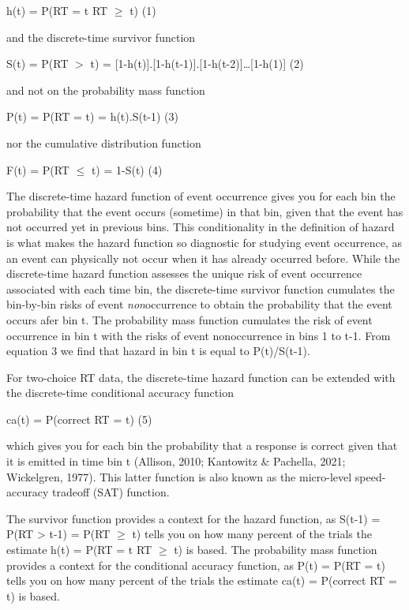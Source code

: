 \documentclass[
  man, donotrepeattitle,floatsintext]{apa6}
\begin{document}
\noindent h(t) = P(RT = t\textbar{} RT \(\geq\) t) \hfill  (1)

\noindent and the discrete-time survivor function

\noindent S(t) = P(RT \(>\) t) = {[}1-h(t){]}.{[}1-h(t-1){]}.{[}1-h(t-2){]}\ldots{[}1-h(1){]} \hfill  (2)

\noindent and not on the probability mass function

\noindent P(t) = P(RT = t) = h(t).S(t-1) \hfill  (3)

\noindent nor the cumulative distribution function

\noindent F(t) = P(RT \(\leq\) t) = 1-S(t) \hfill  (4)

The discrete-time hazard function of event occurrence gives you for each bin the probability that the event occurs (sometime) in that bin, given that the event has not occurred yet in previous bins. This conditionality in the definition of hazard is what makes the hazard function so diagnostic for studying event occurrence, as an event can physically not occur when it has already occurred before. While the discrete-time hazard function assesses the unique risk of event occurrence associated with each time bin, the discrete-time survivor function cumulates the bin-by-bin risks of event \emph{non}occurrence to obtain the probability that the event occurs afer bin t. The probability mass function cumulates the risk of event occurrence in bin t with the risks of event nonoccurrence in bins 1 to t-1. From equation 3 we find that hazard in bin t is equal to P(t)/S(t-1).

For two-choice RT data, the discrete-time hazard function can be extended with the discrete-time conditional accuracy function

\noindent ca(t) = P(correct \textbar{} RT = t) \hfill  (5)

\noindent which gives you for each bin the probability that a response is correct given that it is emitted in time bin t (Allison, 2010; Kantowitz \& Pachella, 2021; Wickelgren, 1977). This latter function is also known as the micro-level speed-accuracy tradeoff (SAT) function.

The survivor function provides a context for the hazard function, as S(t-1) = P(RT \textgreater{} t-1) = P(RT \(\geq\) t) tells you on how many percent of the trials the estimate h(t) = P(RT = t\textbar{} RT \(\geq\) t) is based. The probability mass function provides a context for the conditional accuracy function, as P(t) = P(RT = t) tells you on how many percent of the trials the estimate ca(t) = P(correct \textbar{} RT = t) is based.
\end{document}
